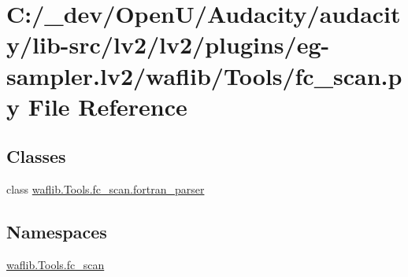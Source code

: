 \hypertarget{lv2_2plugins_2eg-sampler_8lv2_2waflib_2_tools_2fc__scan_8py}{}\section{C\+:/\+\_\+dev/\+Open\+U/\+Audacity/audacity/lib-\/src/lv2/lv2/plugins/eg-\/sampler.lv2/waflib/\+Tools/fc\+\_\+scan.py File Reference}
\label{lv2_2plugins_2eg-sampler_8lv2_2waflib_2_tools_2fc__scan_8py}
\subsection*{Classes}
\begin{DoxyCompactItemize}
\item 
class \hyperlink{classwaflib_1_1_tools_1_1fc__scan_1_1fortran__parser}{waflib.\+Tools.\+fc\+\_\+scan.\+fortran\+\_\+parser}
\end{DoxyCompactItemize}
\subsection*{Namespaces}
\begin{DoxyCompactItemize}
\item 
 \hyperlink{namespacewaflib_1_1_tools_1_1fc__scan}{waflib.\+Tools.\+fc\+\_\+scan}
\end{DoxyCompactItemize}
